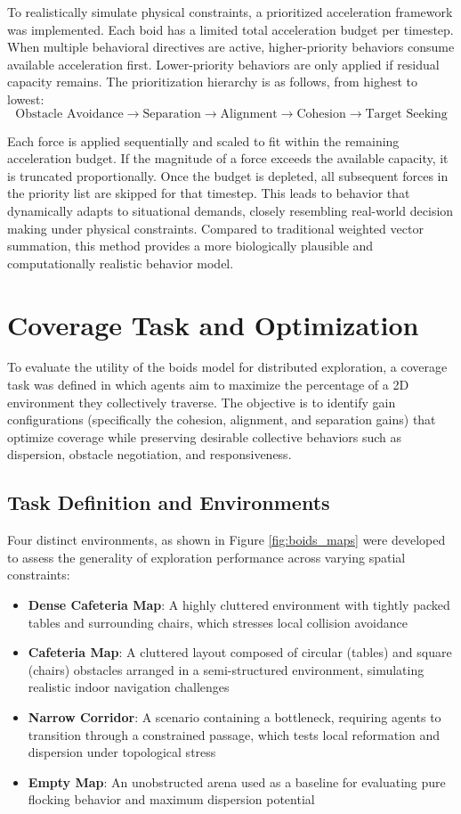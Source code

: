 \documentclass[12pt]{article}
\begin{document}
\sloppypar
To realistically simulate physical constraints, a prioritized acceleration framework was implemented. Each boid has a limited total acceleration budget per timestep. When multiple behavioral directives are active, higher-priority behaviors consume available acceleration first. Lower-priority behaviors are only applied if residual capacity remains. The prioritization hierarchy is as follows, from highest to lowest:
\[\text{Obstacle Avoidance} \to \text{Separation} \to \text{Alignment} \to \text{Cohesion} \to \text{Target Seeking}\]

Each force is applied sequentially and scaled to fit within the remaining acceleration budget. If the magnitude of a force exceeds the available capacity, it is truncated proportionally. Once the budget is depleted, all subsequent forces in the priority list are skipped for that timestep. This leads to behavior that dynamically adapts to situational demands, closely resembling real-world decision making under physical constraints. Compared to traditional weighted vector summation, this method provides a more biologically plausible and computationally realistic behavior model.

\section{Coverage Task and Optimization}

To evaluate the utility of the boids model for distributed exploration, a coverage task was defined in which agents aim to maximize the percentage of a 2D environment they collectively traverse. The objective is to identify gain configurations (specifically the cohesion, alignment, and separation gains) that optimize coverage while preserving desirable collective behaviors such as dispersion, obstacle negotiation, and responsiveness.

\subsection{Task Definition and Environments}

Four distinct environments, as shown in Figure \ref{fig:boids_maps} were developed to assess the generality of exploration performance across varying spatial constraints:
\begin{itemize}[nosep]
    \item \textbf{Dense Cafeteria Map}: A highly cluttered environment with tightly packed tables and surrounding chairs, which stresses local collision avoidance
    \item \textbf{Cafeteria Map}: A cluttered layout composed of circular (tables) and square (chairs) obstacles arranged in a semi-structured environment, simulating realistic indoor navigation challenges
    \item \textbf{Narrow Corridor}: A scenario containing a bottleneck, requiring agents to transition through a constrained passage, which tests local reformation and dispersion under topological stress
    \item \textbf{Empty Map}: An unobstructed arena used as a baseline for evaluating pure flocking behavior and maximum dispersion potential
\end{itemize}
\end{document}
